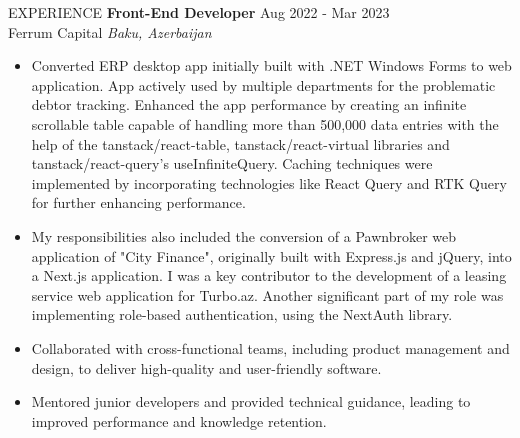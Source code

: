 \documentclass{resume} %
\begin{document}
\begin{rSection}{EXPERIENCE}
\textbf{Front-End Developer} \hfill Aug 2022 - Mar 2023\\
Ferrum Capital \hfill \textit{Baku, Azerbaijan}
 \begin{itemize}
    \itemsep -3pt {}
    \item 
    Converted ERP desktop app initially built with .NET Windows Forms to web application. App actively used by multiple departments for the problematic debtor tracking. Enhanced the app performance by creating an infinite scrollable table capable of handling more than 500,000 data entries with the help of the tanstack/react-table, tanstack/react-virtual libraries and tanstack/react-query's useInfiniteQuery. Caching techniques were implemented by incorporating technologies like React Query and RTK Query for further enhancing performance.
    \item 
    My responsibilities also included the conversion of a Pawnbroker web application of "City Finance", originally built with Express.js and jQuery, into a Next.js application. I was a key contributor to the development of a leasing service web application for Turbo.az. Another significant part of my role was implementing role-based authentication, using the NextAuth library.
     \item Collaborated with cross-functional teams, including product management and design, to deliver high-quality and user-friendly software.
     \item Mentored junior developers and provided technical guidance, leading to improved performance and knowledge retention.
 \end{itemize}
\end{rSection}

\end{document}
